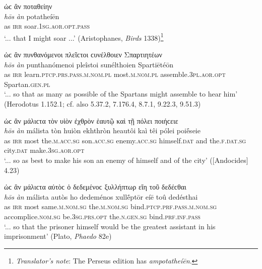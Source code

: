 \begin{exe}
\ex ὡϲ ἂν ποταθείην\\
\gll \emph{hōs} \emph{àn} potatheíēn\\
as \textsc{irr} soar.\textsc{1sg.aor.opt.pass}\\
\trans `... that I might soar ...' (Aristophanes, \textit{Birds} 1338)\footnote{\emph{Translator's note}: The Perseus edition has \textit{ampotatheíēn}.}
\label{hosan7}
\end{exe}

\begin{exe}
\ex ὡϲ ἂν πυνθανόμενοι πλεῖϲτοι ϲυνέλθοιεν Σπαρτιητέων\\
\gll \emph{hōs} \emph{àn} punthanómenoi pleîstoi sunélthoien Spartiētéōn\\
as \textsc{irr} learn.\textsc{ptcp.prs.pass.m.nom.pl} most.\textsc{m.nom.pl} assemble.\textsc{3pl.aor.opt} Spartan.\textsc{gen.pl}\\
\trans `... so that as many as possible of the Spartans might assemble to hear him' (Herodotus 1.152.1; cf. also 5.37.2, 7.176.4, 8.7.1, 9.22.3, 9.51.3)
\label{hosan8}
\end{exe}

\begin{exe}
\ex ὡϲ ἂν μάλιϲτα τὸν υἱὸν ἐχθρὸν ἑαυτῷ καὶ τῇ πόλει ποιήϲειε\\
\gll \emph{hōs} \emph{àn} málista tòn huiòn ekhthròn heautôi kaì têi pólei poiḗseie\\
as \textsc{irr} most the.\textsc{m.acc.sg} son.\textsc{acc.sg}
enemy.\textsc{acc.sg} himself.\textsc{dat} and the.\textsc{f.dat.sg} city.\textsc{dat} make.\textsc{3sg.aor.opt}\\
\trans `... so as best to make his son an enemy of himself and of the city' ({[}Andocides{]} 4.23)
\label{hosan9}
\end{exe}

\begin{exe}
\ex ὡϲ ἂν μάλιϲτα αὐτὸϲ ὁ δεδεμένοϲ ξυλλήπτωρ εἴη τοῦ δεδέϲθαι\\
\gll \emph{hōs} \emph{àn} málista autòs ho dedeménos xullḗptōr eíē toû dedésthai\\
as \textsc{irr} most same.\textsc{m.nom.sg} the.\textsc{m.nom.sg} bind.\textsc{ptcp.prf.pass.m.nom.sg} accomplice.\textsc{nom.sg} be.\textsc{3sg.prs.opt} the.\textsc{n.gen.sg} bind.\textsc{prf.inf.pass}\\
\trans `... so that the prisoner himself would be the greatest assistant in his imprisonment' (Plato, \textit{Phaedo} 82e)
\label{hosan10}
\end{exe}

